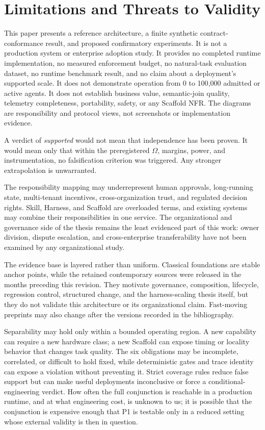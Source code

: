 \documentclass[11pt]{article}
\begin{document}
\section{Limitations and Threats to Validity}
\label{sec:limitations}

This paper presents a reference architecture, a finite synthetic contract-conformance result, and proposed confirmatory experiments. It is not a production system or enterprise adoption study. It provides no completed runtime implementation, no measured enforcement budget, no natural-task evaluation dataset, no runtime benchmark result, and no claim about a deployment's supported scale. It does not demonstrate operation from 0 to 100{,}000 admitted or active agents. It does not establish business value, semantic-join quality, telemetry completeness, portability, safety, or any Scaffold NFR. The diagrams are responsibility and protocol views, not screenshots or implementation evidence.

A verdict of \textit{supported} would not mean that independence has been proven. It would mean only that within the preregistered $\Omega$, margins, power, and instrumentation, no falsification criterion was triggered. Any stronger extrapolation is unwarranted.

The responsibility mapping may underrepresent human approvals, long-running state, multi-tenant incentives, cross-organization trust, and regulated decision rights. Skill, Harness, and Scaffold are overloaded terms, and existing systems may combine their responsibilities in one service. The organizational and governance side of the thesis remains the least evidenced part of this work: owner division, dispute escalation, and cross-enterprise transferability have not been examined by any organizational study.

The evidence base is layered rather than uniform. Classical foundations are stable anchor points, while the retained contemporary sources were released in the months preceding this revision. They motivate governance, composition, lifecycle, regression control, structured change, and the harness-scaling thesis itself, but they do not validate this architecture or its organizational claim. Fast-moving preprints may also change after the versions recorded in the bibliography.

Separability may hold only within a bounded operating region. A new capability can require a new hardware class; a new Scaffold can expose timing or locality behavior that changes task quality. The six obligations may be incomplete, correlated, or difficult to hold fixed, while deterministic gates and trace identity can expose a violation without preventing it. Strict coverage rules reduce false support but can make useful deployments inconclusive or force a conditional-engineering verdict. How often the full conjunction is reachable in a production runtime, and at what engineering cost, is unknown to us; it is possible that the conjunction is expensive enough that P1 is testable only in a reduced setting whose external validity is then in question.
\end{document}
